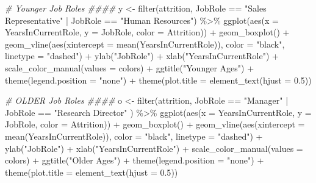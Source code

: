 \documentclass[
]{article}
\newenvironment{Shaded}{\begin{snugshade}}{\end{snugshade}}
\newcommand{\AttributeTok}[1]{\textcolor[rgb]{0.77,0.63,0.00}{#1}}
\newcommand{\CommentTok}[1]{\textcolor[rgb]{0.56,0.35,0.01}{\textit{#1}}}
\newcommand{\FloatTok}[1]{\textcolor[rgb]{0.00,0.00,0.81}{#1}}
\newcommand{\FunctionTok}[1]{\textcolor[rgb]{0.00,0.00,0.00}{#1}}
\newcommand{\NormalTok}[1]{#1}
\newcommand{\OtherTok}[1]{\textcolor[rgb]{0.56,0.35,0.01}{#1}}
\newcommand{\SpecialCharTok}[1]{\textcolor[rgb]{0.00,0.00,0.00}{#1}}
\newcommand{\StringTok}[1]{\textcolor[rgb]{0.31,0.60,0.02}{#1}}
\begin{document}
\begin{Shaded}
\begin{Highlighting}[]
\CommentTok{\# Younger Job Roles \#\#\#\#}
\NormalTok{y }\OtherTok{\textless{}{-}} \FunctionTok{filter}\NormalTok{(attrition, JobRole }\SpecialCharTok{==} \StringTok{"Sales Representative"} \SpecialCharTok{|}\NormalTok{ JobRole }\SpecialCharTok{==} \StringTok{"Human Resources"}\NormalTok{) }\SpecialCharTok{\%\textgreater{}\%}
  \FunctionTok{ggplot}\NormalTok{(}\FunctionTok{aes}\NormalTok{(}\AttributeTok{x =}\NormalTok{ YearsInCurrentRole, }\AttributeTok{y =}\NormalTok{ JobRole, }\AttributeTok{color =}\NormalTok{ Attrition)) }\SpecialCharTok{+}
  \FunctionTok{geom\_boxplot}\NormalTok{() }\SpecialCharTok{+}
  \FunctionTok{geom\_vline}\NormalTok{(}\FunctionTok{aes}\NormalTok{(}\AttributeTok{xintercept =} \FunctionTok{mean}\NormalTok{(YearsInCurrentRole)), }\AttributeTok{color =} \StringTok{"black"}\NormalTok{, }\AttributeTok{linetype =} \StringTok{"dashed"}\NormalTok{) }\SpecialCharTok{+}
  \FunctionTok{ylab}\NormalTok{(}\StringTok{"JobRole"}\NormalTok{) }\SpecialCharTok{+}
  \FunctionTok{xlab}\NormalTok{(}\StringTok{"YearsInCurrentRole"}\NormalTok{) }\SpecialCharTok{+}
  \FunctionTok{scale\_color\_manual}\NormalTok{(}\AttributeTok{values =}\NormalTok{ colors) }\SpecialCharTok{+}
  \FunctionTok{ggtitle}\NormalTok{(}\StringTok{"Younger Ages"}\NormalTok{) }\SpecialCharTok{+}
  \FunctionTok{theme}\NormalTok{(}\AttributeTok{legend.position =} \StringTok{"none"}\NormalTok{) }\SpecialCharTok{+}
  \FunctionTok{theme}\NormalTok{(}\AttributeTok{plot.title =} \FunctionTok{element\_text}\NormalTok{(}\AttributeTok{hjust =} \FloatTok{0.5}\NormalTok{)) }
  

\CommentTok{\# OLDER Job Roles \#\#\#\#}
\NormalTok{o }\OtherTok{\textless{}{-}} \FunctionTok{filter}\NormalTok{(attrition, JobRole }\SpecialCharTok{==} \StringTok{"Manager"} \SpecialCharTok{|}\NormalTok{ JobRole }\SpecialCharTok{==} \StringTok{"Research Director"}\NormalTok{ ) }\SpecialCharTok{\%\textgreater{}\%}
  \FunctionTok{ggplot}\NormalTok{(}\FunctionTok{aes}\NormalTok{(}\AttributeTok{x =}\NormalTok{ YearsInCurrentRole, }\AttributeTok{y =}\NormalTok{ JobRole, }\AttributeTok{color =}\NormalTok{ Attrition)) }\SpecialCharTok{+}
  \FunctionTok{geom\_boxplot}\NormalTok{() }\SpecialCharTok{+}
  \FunctionTok{geom\_vline}\NormalTok{(}\FunctionTok{aes}\NormalTok{(}\AttributeTok{xintercept =} \FunctionTok{mean}\NormalTok{(YearsInCurrentRole)), }\AttributeTok{color =} \StringTok{"black"}\NormalTok{, }\AttributeTok{linetype =} \StringTok{"dashed"}\NormalTok{) }\SpecialCharTok{+}
  \FunctionTok{ylab}\NormalTok{(}\StringTok{"JobRole"}\NormalTok{) }\SpecialCharTok{+}
  \FunctionTok{xlab}\NormalTok{(}\StringTok{"YearsInCurrentRole"}\NormalTok{) }\SpecialCharTok{+}
  \FunctionTok{scale\_color\_manual}\NormalTok{(}\AttributeTok{values =}\NormalTok{ colors) }\SpecialCharTok{+}
  \FunctionTok{ggtitle}\NormalTok{(}\StringTok{"Older Ages"}\NormalTok{) }\SpecialCharTok{+}
  \FunctionTok{theme}\NormalTok{(}\AttributeTok{legend.position =} \StringTok{"none"}\NormalTok{) }\SpecialCharTok{+}
  \FunctionTok{theme}\NormalTok{(}\AttributeTok{plot.title =} \FunctionTok{element\_text}\NormalTok{(}\AttributeTok{hjust =} \FloatTok{0.5}\NormalTok{)) }



\end{Highlighting}
\end{Shaded}
\end{document}
